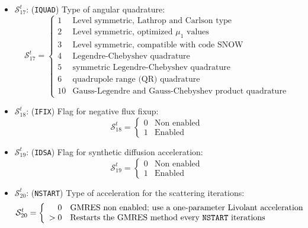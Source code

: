 \begin{itemize}
\item $\mathcal{S}^{t}_{17}$: ({\tt IQUAD}) Type of angular quadrature:
\begin{displaymath}
\mathcal{S}^{t}_{17} = \left\{
\begin{array}{rl}
 1 & \textrm{Level symmetric, Lathrop and Carlson type} \\
 2 & \textrm{Level symmetric, optimized $\mu_1$ values} \\
 3 & \textrm{Level symmetric, compatible with code SNOW} \\
 4 & \textrm{Legendre-Chebyshev quadrature} \\
 5 & \textrm{symmetric Legendre-Chebyshev quadrature} \\
 6 & \textrm{quadrupole range (QR) quadrature} \\
 10 & \textrm{Gauss-Legendre and Gauss-Chebyshev product quadrature}
\end{array} \right.
\end{displaymath}

\item $\mathcal{S}^{t}_{18}$: ({\tt IFIX}) Flag for negative flux fixup:
\begin{displaymath}
\mathcal{S}^{t}_{18} = \left\{
\begin{array}{rl}
 0 & \textrm{Non enabled} \\
 1 & \textrm{Enabled}
\end{array} \right.
\end{displaymath}

\item $\mathcal{S}^{t}_{19}$: ({\tt IDSA}) Flag for synthetic diffusion acceleration:
\begin{displaymath}
\mathcal{S}^{t}_{19} = \left\{
\begin{array}{rl}
 0 & \textrm{Non enabled} \\
 1 & \textrm{Enabled}
\end{array} \right.
\end{displaymath}

\item $\mathcal{S}^{t}_{20}$: ({\tt NSTART}) Type of acceleration for the scattering iterations:
\begin{displaymath}
\mathcal{S}^{t}_{20} = \left\{
\begin{array}{rl}
 0 & \textrm{GMRES non enabled; use a one-parameter Livolant acceleration} \\
 >0 & \textrm{Restarts the GMRES method every {\tt NSTART} iterations}
\end{array} \right.
\end{displaymath}


\end{itemize}
